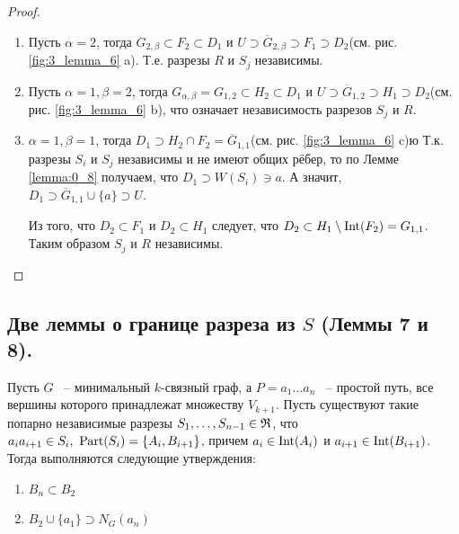 \begin{proof}
	\begin{enumerate}
		\item Пусть $\alpha = 2$, тогда  $G_{2, \beta} \subset F_2 \subset D_1$ и $U \supset \overline G_{2, \beta} \supset F_1 \supset D_2$(см. рис. \ref{fig:3_lemma_6} a).
			Т.е. разрезы $R$ и  $S_j$ независимы.
		\item  Пусть $\alpha = 1, \beta = 2$, тогда $G_{\alpha, \beta} = G_{1, 2} \subset H_2 \subset D_1$ и $U \supset \overline G_{1, 2} \supset H_1 \supset D_2$(см. рис. \ref{fig:3_lemma_6} b), что означает независимость разрезов $S_j$ и  $R$.
		\item  $\alpha = 1, \beta = 1$, тогда $D_1 \supset H_2 \cap F_2 = \overline G_{1, 1}$(см. рис. \ref{fig:3_lemma_6} c)ю
			Т.к. разрезы $S_i$ и  $S_j$ независимы и не имеют общих рёбер, то по Лемме \ref{lemma:0_8} получаем, что  $D_1 \supset W(S_i) \ni a$.
			А значит, $D_1 \supset \overline G_{1, 1} \cup \{a\} \supset U$.

			Из того, что $D_2 \subset F_1$ и $D_2 \subset H_1$ следует, что $D_2 \subset H_1 \setminus \operatorname{Int}(F_2) = G_{1, 1}$.
			Таким образом $S_j$ и  $R$ независимы.
	\end{enumerate}

\end{proof}

\subsection{Две леммы о границе разреза из $S$ (Леммы 7 и 8).}

\begin{customlm}{3.7} \label{lemma:3_7}
	Пусть $G$ ~-- минимальный  $k$-связный граф, а  $P = a_1 \ldots a_n$ ~-- простой путь, все вершины которого принадлежат множеству $V_{k + 1}$.
	Пусть существуют такие попарно независимые разрезы  $S_1, \ldots, S_{n - 1} \in \mathfrak{R}$, что  $a_i a_{i + 1} \in S_i, \ \operatorname{Part}(S_i) = \{A_i, B_{i + 1}\}$, причем  $a_i \in \operatorname{Int}(A_i)$ и  $a_{i + 1} \in \operatorname{Int}(B_{i + 1})$.
	Тогда выполняются следующие утверждения:

	\begin{enumerate}
		\item $B_n \subset B_2$
		\item  $B_2 \cup \{a_1\} \supset N_G(a_n)$
	\end{enumerate}

\end{customlm}

